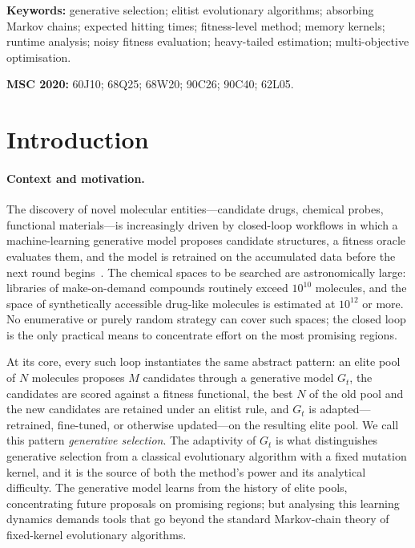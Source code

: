 \documentclass[11pt,a4paper]{article}
\begin{document}
\medskip
\noindent\textbf{Keywords:} generative selection; elitist evolutionary
algorithms; absorbing Markov chains; expected hitting times; fitness-level
method; memory kernels; runtime analysis; noisy fitness evaluation;
heavy-tailed estimation; multi-objective optimisation.

\smallskip
\noindent\textbf{MSC 2020:} 60J10; 68Q25; 68W20; 90C26; 90C40; 62L05.
\newpage
\tableofcontents
\newpage

\section{Introduction}
\label{sec:intro}

\paragraph{Context and motivation.}
The discovery of novel molecular entities---candidate drugs, chemical probes,
functional materials---is increasingly driven by closed-loop workflows in
which a machine-learning generative model proposes candidate structures, a
fitness oracle evaluates them, and the model is retrained on the accumulated
data before the next round begins~\cite{Secker2025,Gorgulla2020,Cecchin2026}.
The chemical spaces to be searched are astronomically large: libraries of
make-on-demand compounds routinely exceed $10^{10}$ molecules, and the space
of synthetically accessible drug-like molecules is estimated at $10^{12}$ or
more.  No enumerative or purely random strategy can cover such spaces; the
closed loop is the only practical means to concentrate effort on the most
promising regions.

At its core, every such loop instantiates the same abstract pattern: an
elite pool of $N$ molecules proposes $M$ candidates through a generative
model $G_t$, the candidates are scored against a fitness functional, the
best $N$ of the old pool and the new candidates are retained under an
elitist rule, and $G_t$ is adapted---retrained, fine-tuned, or otherwise
updated---on the resulting elite pool.  We call this pattern \emph{generative
selection}.  The adaptivity of $G_t$ is what distinguishes generative
selection from a classical evolutionary algorithm with a fixed mutation
kernel, and it is the source of both the method's power and its analytical
difficulty.  The generative model learns from the history of elite pools,
concentrating future proposals on promising regions; but analysing this
learning dynamics demands tools that go beyond the standard Markov-chain
theory of fixed-kernel evolutionary algorithms.
\end{document}
